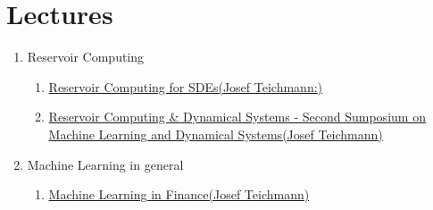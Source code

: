 \section{Lectures}

\begin{enumerate}
    \item Reservoir Computing\begin{enumerate}
        \item \href{https://www.youtube.com/watch?v=AhxROWo_FOw}{Reservoir Computing for SDEs(Josef Teichmann:)}
        \item \href{https://www.youtube.com/watch?v=lak3OjvE_44}{Reservoir Computing \& Dynamical Systems - Second Sumposium on Machine Learning and Dynamical Systems(Josef Teichmann)}
    \end{enumerate}
    \item Machine Learning in general\begin{enumerate}
        \item \href{https://people.math.ethz.ch/~jteichma/index.php?content=teach_mlf2023}{Machine Learning in Finance(Josef Teichmann)}
    \end{enumerate}
\end{enumerate}

